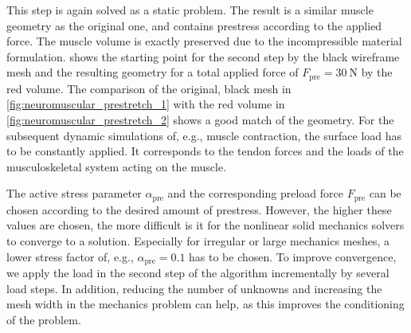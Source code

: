 This step is again solved as a static problem. The result is a similar muscle geometry as the original one, and contains prestress according to the applied force. The muscle volume is exactly preserved due to the incompressible material formulation.  shows the starting point for the second step by the black wireframe mesh and the resulting geometry for a total applied force of $F_\text{pre}=\SI{30}{\newton}$ by the red volume. The comparison of the original, black mesh in \cref{fig:neuromuscular_prestretch_1} with the red volume in \cref{fig:neuromuscular_prestretch_2} shows a good match of the geometry.
For the subsequent dynamic simulations of, e.g., muscle contraction, the surface load has to be constantly applied. It corresponds to the tendon forces and the loads of the musculoskeletal system acting on the muscle.

The active stress parameter $\alpha_\text{pre}$ and the corresponding preload force $F_\text{pre}$ can be chosen according to the desired amount of prestress. However, the higher these values are chosen, the more difficult is it for the nonlinear solid mechanics solvers to converge to a solution. Especially for irregular or large mechanics meshes, a lower stress factor of, e.g., $\alpha_\text{pre}=0.1$ has to be chosen. To improve convergence, we apply the load in the second step of the algorithm incrementally by several load steps. In addition, reducing the number of unknowns and increasing the mesh width in the mechanics problem can help, as this improves the conditioning of the problem. 
 
